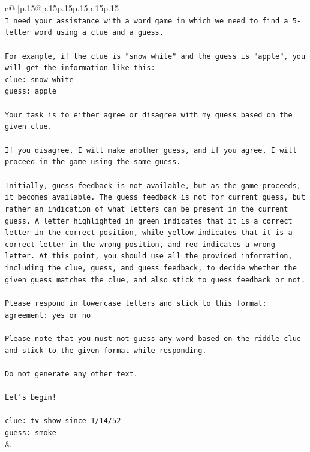 \documentclass{article}
\begin{document}
{\begin{supertabular}{c@{$\;$}|p{.15\linewidth}@{}p{.15\linewidth}p{.15\linewidth}p{.15\linewidth}p{.15\linewidth}p{.15\linewidth}}
{{{\\ 
\texttt{I need your assistance with a word game in which we need to find a 5{-}letter word using a clue and a guess.} \\
\\ 
\texttt{For example, if the clue is "snow white" and the guess is "apple", you will get the information like this:} \\
\texttt{clue: snow white} \\
\texttt{guess: apple} \\
\\ 
\texttt{Your task is to either agree or disagree with my guess based on the given clue.} \\
\\ 
\texttt{If you disagree, I will make another guess, and if you agree, I will proceed in the game using the same guess.} \\
\\ 
\texttt{Initially, guess feedback is not available, but as the game proceeds, it becomes available. The guess feedback is not for current guess, but rather an indication of what letters can be present in the current guess. A letter highlighted in green indicates that it is a correct letter in the correct position, while yellow indicates that it is a correct letter in the wrong position, and red indicates a wrong letter. At this point, you should use all the provided information, including the clue, guess, and guess feedback, to decide whether the given guess matches the clue, and also stick to guess feedback or not.} \\
\\ 
\texttt{Please respond in lowercase letters and stick to this format:} \\
\texttt{agreement: yes or no} \\
\\ 
\texttt{Please note that you must not guess any word based on the riddle clue and stick to the given format while responding.} \\
\\ 
\texttt{Do not generate any other text.} \\
\\ 
\texttt{Let's begin!} \\
\\ 
\texttt{clue: tv show since 1/14/52} \\
\texttt{guess: smoke} \\
            }
        }
    }
    & \\ \\


\end{supertabular}}
\end{document}
